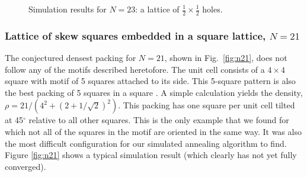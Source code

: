 \documentclass[aps]{revtex4}
\begin{document}
\begin{figure}[H]
\caption{\label{fig:n23}Simulation results for $N=23$: a lattice of $\frac{1}{2} \times \frac{1}{2}$ holes.}
\end{figure}




\subsubsection{Lattice of skew squares embedded in a square lattice, $N=21$}
The conjectured densest packing for  $N=21$, shown in Fig.\ \ref{fig:n21}, does not follow any of the motifs described heretofore. The unit cell consists of a $4 \times 4$ square with motif of 5 squares attached to its side.  This 5-square pattern is also the best packing of 5 squares in a square \cite{Friedman2002}.  A simple calculation yields the density, $\rho= 21/(4^2+(2+1/\sqrt{2})^2)$. This packing has one square per unit cell tilted at 45$^{\circ}$ relative to all other squares.  This is the only example that we found for which not all of the squares in the motif are oriented in the same way. It was also the most difficult configuration for our simulated annealing algorithm to find. Figure \ref{fig:n21} shows a typical simulation result (which clearly has not yet fully converged).
\end{document}
